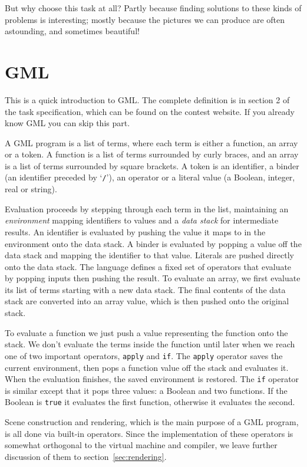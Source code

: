 But why choose this task at all?
Partly because finding solutions to these kinds of problems is interesting;
mostly because the pictures we can produce
are often astounding, and sometimes beautiful!


\section{GML\label{sec:gml}}

This is a quick introduction to GML.
The complete definition is in section 2 of the task specification,
which can be found on the contest website.
If you already know GML you can skip this part.

A GML program is a list of terms,
where each term is either a function, an array or a token.
A function is a list of terms surrounded by curly braces,
and an array is a list of terms surrounded by square brackets.
A token is an identifier, a binder (an identifier preceded by `\verb!/!'),
an operator or a literal value
(a Boolean, integer, real or string).

Evaluation proceeds by stepping through each term in the list,
maintaining an \emph{environment} mapping identifiers to values
and a \emph{data stack} for intermediate results.
An identifier is evaluated by
pushing the value it maps to in the environment onto the data stack.
A binder is evaluated by popping a value off the data stack
and mapping the identifier to that value.
Literals are pushed directly onto the data stack.
The language defines a fixed set of operators
that evaluate by popping inputs then pushing the result.
To evaluate an array,
we first evaluate its list of terms starting with a new data stack.
The final contents of the data stack are converted into an array value,
which is then pushed onto the original stack.

To evaluate a function we just
push a value representing the function onto the stack.
We don't evaluate the terms inside the function until later
when we reach one of two important operators, \verb!apply! and \verb!if!.
The \verb!apply! operator saves the current environment,
then pops a function value off the stack and evaluates it.
When the evaluation finishes, the saved environment is restored.
The \verb!if! operator is similar except that it pops three values:
a Boolean and two functions.
If the Boolean is \verb!true! it evaluates the first function,
otherwise it evaluates the second.

Scene construction and rendering,
which is the main purpose of a GML program,
is all done via built-in operators.
Since the implementation of these operators is somewhat orthogonal
to the virtual machine and compiler,
we leave further discussion of them to section~\ref{sec:rendering}.

